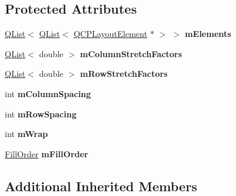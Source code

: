 \subsection*{Protected Attributes}
\begin{DoxyCompactItemize}
\item 
\hyperlink{class_q_list}{Q\+List}$<$ \hyperlink{class_q_list}{Q\+List}$<$ \hyperlink{class_q_c_p_layout_element}{Q\+C\+P\+Layout\+Element} $\ast$ $>$ $>$ {\bfseries m\+Elements}\hypertarget{class_q_c_p_layout_grid_a88fddf7fc3ee0369c36d6dd65596d534}{}\label{class_q_c_p_layout_grid_a88fddf7fc3ee0369c36d6dd65596d534}

\item 
\hyperlink{class_q_list}{Q\+List}$<$ double $>$ {\bfseries m\+Column\+Stretch\+Factors}\hypertarget{class_q_c_p_layout_grid_a9f588eada89ff288965f5e46db2a70ab}{}\label{class_q_c_p_layout_grid_a9f588eada89ff288965f5e46db2a70ab}

\item 
\hyperlink{class_q_list}{Q\+List}$<$ double $>$ {\bfseries m\+Row\+Stretch\+Factors}\hypertarget{class_q_c_p_layout_grid_af8c1afff6c31b4062876c8d29fa2ad44}{}\label{class_q_c_p_layout_grid_af8c1afff6c31b4062876c8d29fa2ad44}

\item 
int {\bfseries m\+Column\+Spacing}\hypertarget{class_q_c_p_layout_grid_ae9ac48f0791be07ead0a96dbd5622770}{}\label{class_q_c_p_layout_grid_ae9ac48f0791be07ead0a96dbd5622770}

\item 
int {\bfseries m\+Row\+Spacing}\hypertarget{class_q_c_p_layout_grid_a8b67f183f4645739cc4c794d75843b40}{}\label{class_q_c_p_layout_grid_a8b67f183f4645739cc4c794d75843b40}

\item 
int {\bfseries m\+Wrap}\hypertarget{class_q_c_p_layout_grid_a17d90c289139847f68cca9e75d64b0fd}{}\label{class_q_c_p_layout_grid_a17d90c289139847f68cca9e75d64b0fd}

\item 
\hyperlink{class_q_c_p_layout_grid_a7d49ee08773de6b2fd246edfed353cca}{Fill\+Order} {\bfseries m\+Fill\+Order}\hypertarget{class_q_c_p_layout_grid_a35a20072cbca5659dd75ca74eae87beb}{}\label{class_q_c_p_layout_grid_a35a20072cbca5659dd75ca74eae87beb}

\end{DoxyCompactItemize}
\subsection*{Additional Inherited Members}


